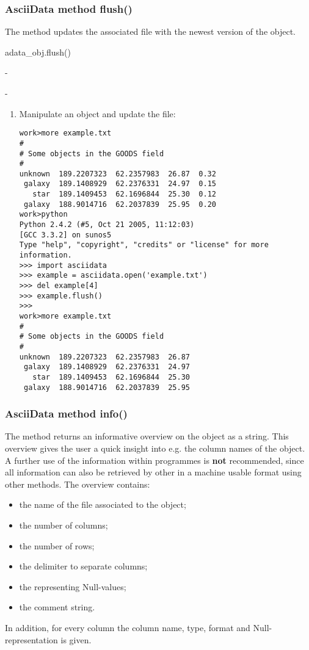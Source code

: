 \subsubsection{AsciiData method flush()}
\label{adm_flush}
The method updates the associated file with the newest version of the
\ad object.

adata\_obj.flush()

-

-

\begin{enumerate}
\item Manipulate an \ad object and update the file:
\begin{small}
\begin{verbatim}
work>more example.txt
#
# Some objects in the GOODS field
#
unknown  189.2207323  62.2357983  26.87  0.32
 galaxy  189.1408929  62.2376331  24.97  0.15
   star  189.1409453  62.1696844  25.30  0.12
 galaxy  188.9014716  62.2037839  25.95  0.20
work>python
Python 2.4.2 (#5, Oct 21 2005, 11:12:03)
[GCC 3.3.2] on sunos5
Type "help", "copyright", "credits" or "license" for more information.
>>> import asciidata
>>> example = asciidata.open('example.txt')
>>> del example[4]
>>> example.flush()
>>>
work>more example.txt
#
# Some objects in the GOODS field
#
unknown  189.2207323  62.2357983  26.87
 galaxy  189.1408929  62.2376331  24.97
   star  189.1409453  62.1696844  25.30
 galaxy  188.9014716  62.2037839  25.95
\end{verbatim}
\end{small}
\end{enumerate}

\subsubsection{AsciiData method info()}
\label{adm_info}
The method returns an informative overview on the \ad object as
a string. This overview gives the user a quick insight
into e.g. the column names of the object. A further use of the
information within programmes is {\bf not} recommended, since all information
can also be retrieved by other in a machine usable format using
other methods. The overview contains:
\begin{itemize}
\item the name of the file associated to the \ad object;
\item the number of columns;
\item the number of rows;
\item the delimiter to separate columns;
\item the representing Null-values;
\item the comment string.
\end{itemize}
In addition, for every column the column name, type, format and
Null-representation is given.

